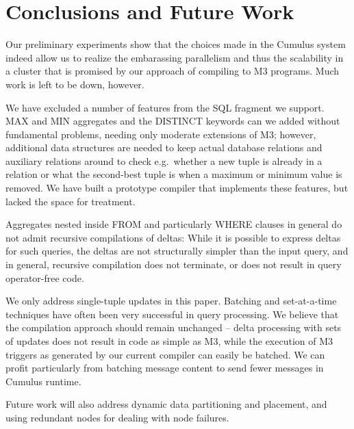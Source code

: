 

\section{Conclusions and Future Work}
\label{sec:conclusions}


Our preliminary experiments show that the choices made in the Cumulus
system indeed allow us to realize the embarassing parallelism and
thus the scalability in a cluster that is promised by our approach of
compiling to M3 programs. Much work is left to be down, however.


We have excluded a number of features from the SQL fragment we support.
MAX and MIN aggregates and the DISTINCT keywords can we added without
fundamental problems, needing only moderate extensions of M3; however,
additional data structures are needed to keep actual database relations
and auxiliary relations
around to check e.g.\ whether a new tuple is already in a relation or what the
second-best tuple is when a maximum or minimum value is removed. We
have built a prototype compiler that implements these features, but lacked the
space for treatment.

Aggregates nested inside FROM and particularly WHERE clauses in general
do not admit recursive compilations of deltas: While it is possible to express
deltas for such queries, the deltas are not structurally simpler than the
input query, and in general, recursive compilation does not terminate,
or does not result in query operator-free code.

We only address single-tuple updates in this paper.
Batching and set-at-a-time techniques have often been
very successful in query processing.
We believe that the compilation approach
should remain unchanged -- delta processing with sets of updates does not
result in code as simple as M3, while the
execution of M3 triggers as generated by our current compiler
can easily be batched. We can profit
particularly from batching message content to send fewer messages in
Cumulus runtime. 



Future work will also address dynamic data partitioning and placement,
and using redundant nodes for
dealing with node failures.


